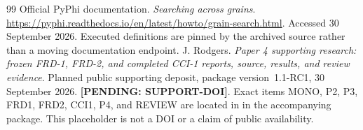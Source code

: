 \documentclass[11pt]{article}
\newcommand{\supportpending}{\textbf{[PENDING: SUPPORT-DOI]}}
\theoremstyle{definition}\newtheorem{definition}[theorem]{Definition}
\theoremstyle{remark}\newtheorem{remark}[theorem]{Remark}
\begin{document}
{\begin{thebibliography}{99}
 Official PyPhi documentation. \emph{Searching across grains}. \url{https://pyphi.readthedocs.io/en/latest/howto/grain-search.html}. Accessed 30 September 2026. Executed definitions are pinned by the archived source rather than a moving documentation endpoint.
 J. Rodgers. \emph{Paper 4 supporting research: frozen FRD-1, FRD-2, and completed CCI-1 reports, source, results, and review evidence}. Planned public supporting deposit, package version~1.1-RC1, 30 September 2026. \supportpending{}. Exact items MONO, P2, P3, FRD1, FRD2, CCI1, P4, and REVIEW are located in  in the accompanying package. This placeholder is not a DOI or a claim of public availability.
\end{thebibliography}
}
\end{document}
